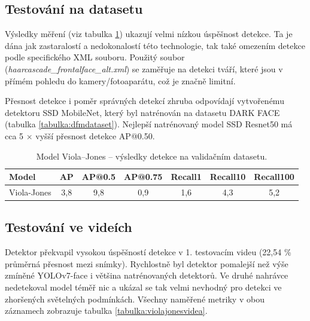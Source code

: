 \subsection*{Testování na datasetu}
Výsledky měření (viz tabulka \ref{tabulka:violajones}) ukazují velmi nízkou úspěšnost detekce. Ta je dána jak zastaralostí a nedokonalostí této technologie, tak také omezením detekce podle specifického XML souboru. Použitý soubor (\emph{haarcascade\_frontalface\_alt.xml}) se zaměřuje na detekci tváří, které jsou v přímém pohledu do kamery/fotoaparátu, což je značně limitní. 

Přesnost detekce i poměr správných detekcí zhruba odpovídají vytvořenému detektoru SSD MobileNet, který byl natrénován na datasetu DARK FACE (tabulka \ref{tabulka:dfmdataset}). Nejlepší natrénovaný model SSD Resnet50 má cca 5 $\times$ vyšší přesnost detekce AP@0.50.

\begin{table}[H]
  \begin{center}
    \begin{tabular}{|l|c|c|c|c|c|c|}
    \hline
    \rowcolor[HTML]{E0DBDB} 
    \textbf{Model}                      & \textbf{AP} & \textbf{AP@0.5} & \textbf{AP@0.75} & \textbf{Recall1} & \textbf{Recall10} & \textbf{Recall100} \\ \hline
    \cellcolor[HTML]{E0DBDB}Viola-Jones & 3,8         & 9,8             & 0,9              & 1,6              & 4,3               & 5,2                \\ \hline
    \end{tabular}
    \label{tabulka:violajones}
    \caption{Model Viola--Jones -- výsledky detekce na validačním datasetu.}
  \end{center}
\end{table}

\subsection*{Testování ve videích}
Detektor překvapil vysokou úspěšností detekce v 1. testovacím videu (22,54 \% průměrná přesnost mezi snímky). Rychlostně byl detektor pomalejší než výše zmíněné YOLOv7-face i většina natrénovaných detektorů. Ve druhé nahrávce nedetekoval model téměř nic a ukázal se tak velmi nevhodný pro detekci ve zhoršených světelných podmínkách. Všechny naměřené metriky v obou záznamech zobrazuje tabulka \ref{tabulka:violajonesvidea}.

